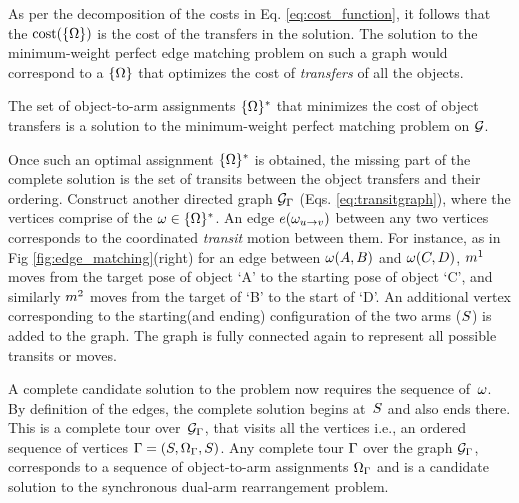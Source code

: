 As per the decomposition of the costs in Eq. \ref{eq:cost_function}, it follows that the $ \textup{cost}(\{{{\Omega}}\}) $ is the cost of the transfers in the solution. The solution to the minimum-weight perfect edge matching problem on such a graph would correspond to a $ \{{{\Omega}}\} $ that optimizes the cost of \textit{transfers} of all the objects.

{
The set of object-to-arm assignments $ \{{{\Omega}}\}^* $ that minimizes the cost of object transfers is a solution to the minimum-weight perfect matching problem on $ \mathcal{G} $.
}

Once such an optimal assignment $ \{{{\Omega}}\}^* $ is obtained, the missing part of the complete solution is the set of transits between the object transfers and their ordering. Construct another directed graph $ \mathcal{G}_{{\Gamma}} $ (Eqs. \ref{eq:transitgraph}), where the vertices comprise of the $ {\omega} \in \{{{\Omega}}\}^*$. An edge $ e({\omega}_{u\rightarrow v}) $ between any two vertices corresponds to the coordinated \textit{transit} motion between them. For instance, as in Fig \ref{fig:edge_matching}(right) for an edge between $ {\omega}(A,B) $ and $ {\omega}(C,D) $, $ m^1 $ moves from the target pose of object `A' to the starting pose of object `C', and similarly $ m^2 $ moves from the target of `B' to the start of `D'. An additional vertex corresponding to the starting(and ending) configuration of the two arms ($ S $) is added to the graph. The graph is fully connected again to represent all possible transits or moves.  


A complete candidate solution to the problem now requires the sequence of~$ {\omega} $. By definition of the edges, the complete solution begins at~$ S $ and also ends there. This is a complete tour over~$ \mathcal{G}_{{\Gamma}} $, that visits all the vertices i.e., an ordered sequence of vertices ${\Gamma} = ( {S}, {{\Omega}}_{\Gamma}, {S}  )$.
\vspace{-0.1in}
{
\lemma [Tour]
Any complete tour $ {\Gamma} $ over the graph $ \mathcal{G}_{{\Gamma}} $, corresponds to a sequence of object-to-arm assignments $ {{\Omega}}_{\Gamma} $ and is a candidate solution to the synchronous dual-arm rearrangement problem.
}



